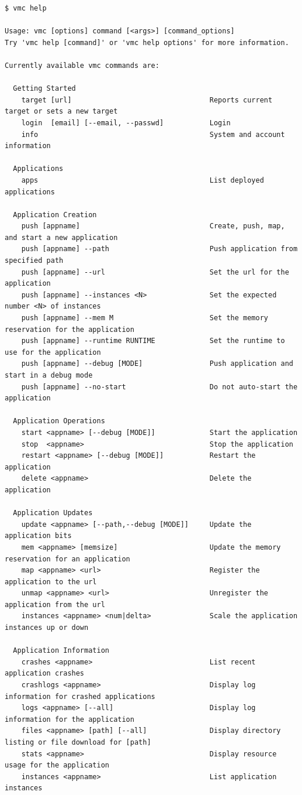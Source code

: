 \lstset{language=bash,caption=Hasil opsi help dari vmc}
\begin{lstlisting}
$ vmc help 

Usage: vmc [options] command [<args>] [command_options] 
Try 'vmc help [command]' or 'vmc help options' for more information. 

Currently available vmc commands are: 

  Getting Started 
    target [url]                                 Reports current target or sets a new target 
    login  [email] [--email, --passwd]           Login 
    info                                         System and account information 

  Applications 
    apps                                         List deployed applications 

  Application Creation 
    push [appname]                               Create, push, map, and start a new application 
    push [appname] --path                        Push application from specified path 
    push [appname] --url                         Set the url for the application 
    push [appname] --instances <N>               Set the expected number <N> of instances 
    push [appname] --mem M                       Set the memory reservation for the application 
    push [appname] --runtime RUNTIME             Set the runtime to use for the application 
    push [appname] --debug [MODE]                Push application and start in a debug mode 
    push [appname] --no-start                    Do not auto-start the application 

  Application Operations 
    start <appname> [--debug [MODE]]             Start the application 
    stop  <appname>                              Stop the application 
    restart <appname> [--debug [MODE]]           Restart the application 
    delete <appname>                             Delete the application 

  Application Updates 
    update <appname> [--path,--debug [MODE]]     Update the application bits 
    mem <appname> [memsize]                      Update the memory reservation for an application 
    map <appname> <url>                          Register the application to the url 
    unmap <appname> <url>                        Unregister the application from the url 
    instances <appname> <num|delta>              Scale the application instances up or down 

  Application Information 
    crashes <appname>                            List recent application crashes 
    crashlogs <appname>                          Display log information for crashed applications 
    logs <appname> [--all]                       Display log information for the application 
    files <appname> [path] [--all]               Display directory listing or file download for [path] 
    stats <appname>                              Display resource usage for the application 
    instances <appname>                          List application instances 


\end{lstlisting}
